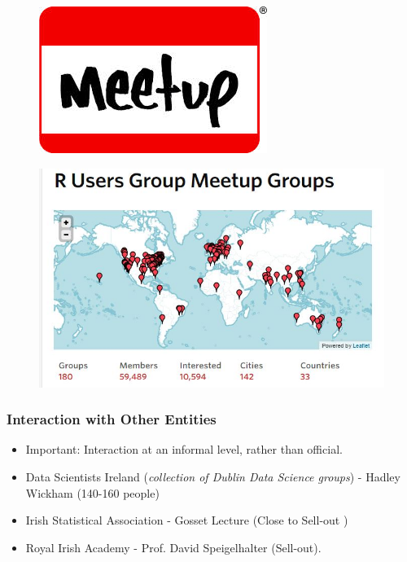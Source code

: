 \documentclass{beamer}
\begin{document}
\begin{frame}
\begin{figure}
\centering
\includegraphics[width=1.11\linewidth]{meetuplogo}
\end{figure}
\end{frame}
\begin{frame}
	\begin{figure}
		\centering
		\includegraphics[width=1.11\linewidth]{rusergroupmap}
	\end{figure}
\end{frame}
\begin{frame}
	
\frametitle{Interaction with Other Entities}
\large
\begin{itemize}
\item Important: Interaction at an informal level, rather than official.
\item Data Scientists Ireland (\textit{collection of Dublin Data Science groups}) - Hadley Wickham (140-160 people)
\item Irish Statistical Association - Gosset Lecture (Close to Sell-out )
\item Royal Irish Academy - Prof. David Speigelhalter (Sell-out).

\end{itemize}
\end{frame}
\end{document}
